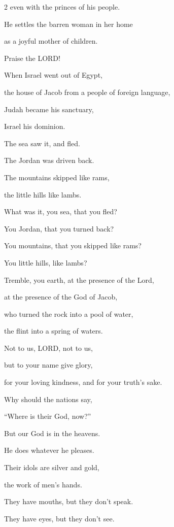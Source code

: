 \begin{multicols}{2}
	even with the princes of his people.
	
	
	\myverse{}He settles the barren woman in her home
	
	as a joyful mother of children.
	
	Praise the LORD!
	
	
	\mychapter{} \myverse*{}When Israel went out of Egypt,
	
	\quad\quad\quad the house of Jacob from a people of foreign language,
	
	
	\myverse{}Judah became his sanctuary,
	
	Israel his dominion.
	
	
	\myverse{}The sea saw it, and fled.
	
	The Jordan was driven back.
	
	
	\myverse{}The mountains skipped like rams,
	
	the little hills like lambs.
	
	
	\myverse{}What was it, you sea, that you fled?
	
	You Jordan, that you turned back?
	
	
	\myverse{}You mountains, that you skipped like rams?
	
	You little hills, like lambs?
	
	
	\myverse{}Tremble, you earth, at the presence of the Lord,
	
	at the presence of the God of Jacob,
	
	
	\myverse{}who turned the rock into a pool of water,
	
	the flint into a spring of waters.
	
	
	\mychapter{} \myverse*{}Not to us, LORD, not to us,
	
	\quad\quad\quad but to your name give glory,
	
	for your loving kindness, and for your truth’s sake.
	
	
	\myverse{}Why should the nations say,
	
	“Where is their God, now?”
	
	
	\myverse{}But our God is in the heavens.
	
	He does whatever he pleases.
	
	
	\myverse{}Their idols are silver and gold,
	
	the work of men’s hands.
	
	
	\myverse{}They have mouths, but they don’t speak.
	
	They have eyes, but they don’t see.
	

\end{multicols}
